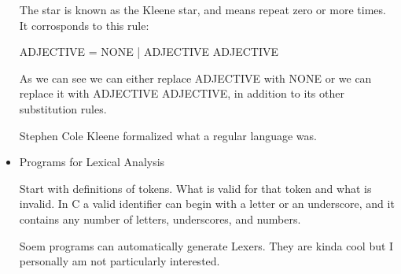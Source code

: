 \documentclass{report}
\begin{document}
\begin{itemize}
        The star is known as the Kleene star, and
        means repeat zero or more times. It corrosponds to this
        rule:

        \begin{mdframed}
            ADJECTIVE = NONE | ADJECTIVE ADJECTIVE
        \end{mdframed}

        As we can see we can either replace ADJECTIVE with NONE or we
        can replace it with ADJECTIVE ADJECTIVE, in addition to its other
        substitution rules.

        Stephen Cole Kleene formalized what a regular language was.

    \item Programs for Lexical Analysis
        \begin{mdframed}
            Start with definitions of tokens. What is valid for that token
            and what is invalid. In C a valid identifier can begin with a
            letter or an underscore, and it contains any number of letters,
            underscores, and numbers.
        \end{mdframed}

        \begin{mdframed}
            Soem programs can automatically generate Lexers. They are kinda
            cool but I personally am not particularly interested.
        \end{mdframed}
\end{itemize}
\end{document}
